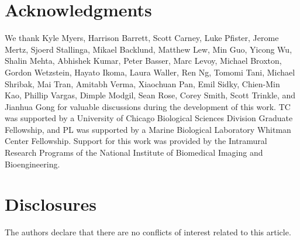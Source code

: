 \documentclass[]{osa-article}
\begin{document}
\section*{Acknowledgments}
We thank Kyle Myers, Harrison Barrett, Scott Carney, Luke Pfister, Jerome Mertz,
Sjoerd Stallinga, Mikael Backlund, Matthew Lew, Min Guo, Yicong Wu, Shalin
Mehta, Abhishek Kumar, Peter Basser, Marc Levoy, Michael Broxton, Gordon
Wetzstein, Hayato Ikoma, Laura Waller, Ren Ng, Tomomi Tani, Michael Shribak, Mai
Tran, Amitabh Verma, Xiaochuan Pan, Emil Sidky, Chien-Min Kao, Phillip Vargas,
Dimple Modgil, Sean Rose, Corey Smith, Scott Trinkle, and Jianhua Gong for
valuable discussions during the development of this work. TC was supported by a
University of Chicago Biological Sciences Division Graduate Fellowship, and PL
was supported by a Marine Biological Laboratory Whitman Center Fellowship.
Support for this work was provided by the Intramural Research Programs of the
National Institute of Biomedical Imaging and Bioengineering.

\section*{Disclosures}
The authors declare that there are no conflicts of interest related to this article.


\appendix
\end{document}
